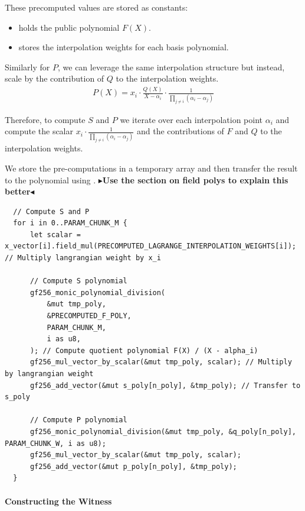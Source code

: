 \documentclass[11pt]{report}
\theoremstyle{definition}
\theoremstyle{plain}
\newcommand{\todo}[1]{{\color[rgb]{.5,0,0}\textbf{$\blacktriangleright$#1$\blacktriangleleft$}}}
\begin{document}
These precomputed values are stored as constants:
\begin{itemize}
  \item {} holds the public polynomial $F(X)$.
  \item {} stores the interpolation weights for each basis polynomial.
\end{itemize}

Similarly for $P$, we can leverage the same interpolation structure but instead, scale by the contribution of $Q$ to the interpolation weights.
\begin{align*}
  P(X) = x_i \cdot \frac{Q(X)}{X - \alpha_i} \cdot \frac{1}{\prod_{j\neq i}(\alpha_i - \alpha_j)}
\end{align*}

Therefore, to compute $S$ and $P$ we iterate over each interpolation point $\alpha_i$ and compute the scalar $x_i \cdot \frac{1}{\prod_{j\neq i}(\alpha_i - \alpha_j)}$ and the contributions of $F$ and $Q$ to the interpolation weights.

We store the pre-computations in a temporary array  and then transfer the result to the polynomial  using .
\todo{Use the section on field polys to explain this better}
\begin{verbatim}
  // Compute S and P
  for i in 0..PARAM_CHUNK_M {
      let scalar = x_vector[i].field_mul(PRECOMPUTED_LAGRANGE_INTERPOLATION_WEIGHTS[i]); // Multiply langrangian weight by x_i

      // Compute S polynomial
      gf256_monic_polynomial_division(
          &mut tmp_poly,
          &PRECOMPUTED_F_POLY,
          PARAM_CHUNK_M,
          i as u8,
      ); // Compute quotient polynomial F(X) / (X - alpha_i)
      gf256_mul_vector_by_scalar(&mut tmp_poly, scalar); // Multiply by langrangian weight
      gf256_add_vector(&mut s_poly[n_poly], &tmp_poly); // Transfer to s_poly

      // Compute P polynomial
      gf256_monic_polynomial_division(&mut tmp_poly, &q_poly[n_poly], PARAM_CHUNK_W, i as u8);
      gf256_mul_vector_by_scalar(&mut tmp_poly, scalar);
      gf256_add_vector(&mut p_poly[n_poly], &tmp_poly);
  }
\end{verbatim}

\paragraph{Constructing the Witness}
\end{document}
